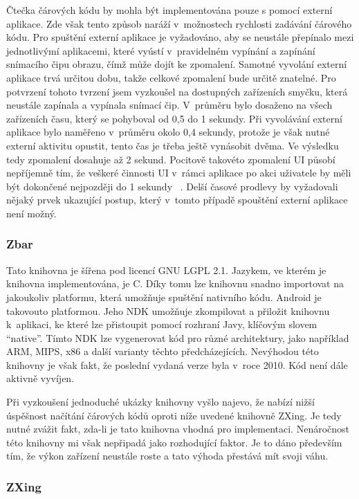 \documentclass[thesis=B,czech]{FITthesis}[2013/10/20]
\begin{document}
Čtečka čárových kódu by mohla být implementována pouze s pomocí externí aplikace. Zde však tento způsob naráží v~možnostech rychlosti zadávání čárového kódu. Pro spuštění externí aplikace je vyžadováno, aby se neustále přepínalo mezi jednotlivýmí aplikacemi, které vyústí v~pravidelném vypínání a zapínání snímacího čipu obrazu, čímž může dojít ke zpomalení. Samotné vyvolání externí aplikace trvá určitou dobu, takže celkové zpomalení bude určitě znatelné. Pro potvrzení tohoto tvrzení jsem vyzkoušel na dostupných zařízeních smyčku, která neustále zapínala a vypínala snímací čip. V~průměru bylo dosaženo na všech zařízeních času, který se pohyboval od 0,5 do 1 sekundy. Při vyvolávání externí aplikace bylo naměřeno v~průměru okolo 0,4 sekundy, protože je však nutné externí aktivitu opustit, tento čas je třeba ještě vynásobit dvěma. Ve výsledku tedy zpomalení dosahuje až 2 sekund. Pocitově takovéto zpomalení UI působí nepříjemně tím, že veškeré činnosti UI v~rámci aplikace po akci uživatele by měli být dokončené nejpozději do 1 sekundy ~\cite{ui_maxlag}. Delší časové prodlevy by vyžadovali nějaký prvek ukazující postup, který v~tomto případě spouštění externí aplikace není možný.

\subsubsection{Zbar ~\cite{zbar}}

Tato knihovna je šířena pod licencí GNU LGPL 2.1. Jazykem, ve kterém je knihovna implementována, je C. Díky tomu lze knihovnu snadno importovat na jakoukoliv platformu, která umožňuje spuštění nativního kódu. Android je takovouto platformou. Jeho NDK umožňuje zkompilovat a přiložit knihovnu k~aplikaci, ke které lze přistoupit pomocí rozhraní Javy, klíčovým slovem ``native''. Tímto NDK lze vygenerovat kód pro různé architektury, jako například ARM, MIPS, x86 a další varianty těchto předcházejících. Nevýhodou této knihovny je však fakt, že poslední vydaná verze byla v~roce 2010. Kód není dále aktivně vyvíjen.

Při vyzkoušení jednoduché ukázky knihovny vyšlo najevo, že nabízí nižší úspěšnost načítání čárových kódů oproti níže uvedené knihovně ZXing. Je tedy nutné zvážit fakt, zda-li je tato knihovna vhodná pro implementaci. Nenáročnost této knihovny mi však nepřipadá jako rozhodující faktor. Je to dáno především tím, že výkon zařízení neustále roste a tato výhoda přestává mít svoji váhu.

\subsubsection{ZXing ~\cite{zxing}}
\end{document}
